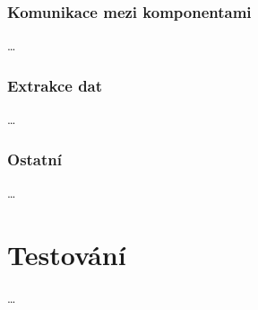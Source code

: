 \documentclass[thesis=B,czech]{FITthesis}[2012/06/26]
\begin{document}
\subsection{Komunikace mezi komponentami}
\dots

\subsection{Extrakce dat}
\dots

\subsection{Ostatní}
\dots


\chapter{Testování}
\dots

\end{document}
